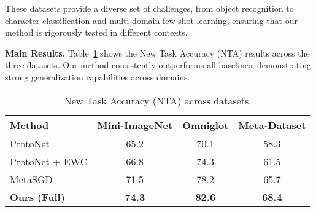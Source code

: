 \documentclass[conference]{IEEEtran}
\begin{document}
These datasets provide a diverse set of challenges, from object recognition to character classification and multi-domain few-shot learning, ensuring that our method is rigorously tested in different contexts.

\textbf{Main Results.}  
Table~\ref{tab:cross_main} shows the New Task Accuracy (NTA) results across the three datasets. Our method consistently outperforms all baselines, demonstrating strong generalization capabilities across domains.

\begin{table}[ht]
\centering
\caption{New Task Accuracy (NTA) across datasets.}
\begin{tabular}{lccc}
\toprule
\textbf{Method} & Mini-ImageNet & Omniglot & Meta-Dataset \\
\midrule
ProtoNet         & 65.2 & 70.1 & 58.3 \\
ProtoNet + EWC   & 66.8 & 74.3 & 61.5 \\
MetaSGD          & 71.5 & 78.2 & 65.7 \\
\textbf{Ours (Full)}      & \textbf{74.3} & \textbf{82.6} & \textbf{68.4} \\
\bottomrule
\end{tabular}
\label{tab:cross_main}
\end{table}
\end{document}
